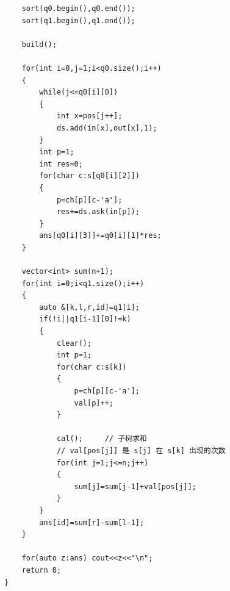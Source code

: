 \begin{verbatim}
    sort(q0.begin(),q0.end());
    sort(q1.begin(),q1.end());

    build();
    
    for(int i=0,j=1;i<q0.size();i++)
    {
        while(j<=q0[i][0])
        {
            int x=pos[j++];
            ds.add(in[x],out[x],1);
        }
        int p=1;
        int res=0;
        for(char c:s[q0[i][2]])
        {
            p=ch[p][c-'a'];
            res+=ds.ask(in[p]);
        }
        ans[q0[i][3]]+=q0[i][1]*res;
    }

    vector<int> sum(n+1);
    for(int i=0;i<q1.size();i++)
    {
        auto &[k,l,r,id]=q1[i];
        if(!i||q1[i-1][0]!=k)
        {
            clear();
            int p=1;
            for(char c:s[k])
            {
                p=ch[p][c-'a'];
                val[p]++;
            }
            
            cal();     // 子树求和
            // val[pos[j]] 是 s[j] 在 s[k] 出现的次数
            for(int j=1;j<=n;j++)
            {
                sum[j]=sum[j-1]+val[pos[j]];
            }
        }
        ans[id]=sum[r]-sum[l-1];
    }

    for(auto z:ans) cout<<z<<"\n";
    return 0;
}
\end{verbatim}